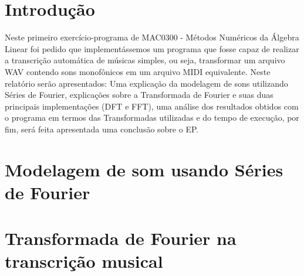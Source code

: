\documentclass[brazil,times]{abnt}
\begin{document}





\data{\today}

\capa

\folhaderosto


\section*{Introdução\label{cap:introducao}}
Neste primeiro exercício-programa de MAC0300 - Métodos Numéricos da Álgebra Linear foi pedido que implementássemos um programa que fosse capaz de realizar a transcrição automática de músicas simples, ou seja, transformar um arquivo WAV contendo sons monofônicos em um arquivo MIDI equivalente. Neste relatório serão apresentados: Uma explicação da modelagem de sons utilizando Séries de Fourier, explicações sobre a Transformada de Fourier e suas duas principais implementações (DFT e FFT), uma análise dos resultados obtidos com o programa em termos das Transformadas utilizadas e do tempo de execução, por fim, será feita apresentada uma conclusão sobre o EP.

\section*{Modelagem de som usando Séries de Fourier}

\section*{Transformada de Fourier na transcrição musical}

\end{document}
